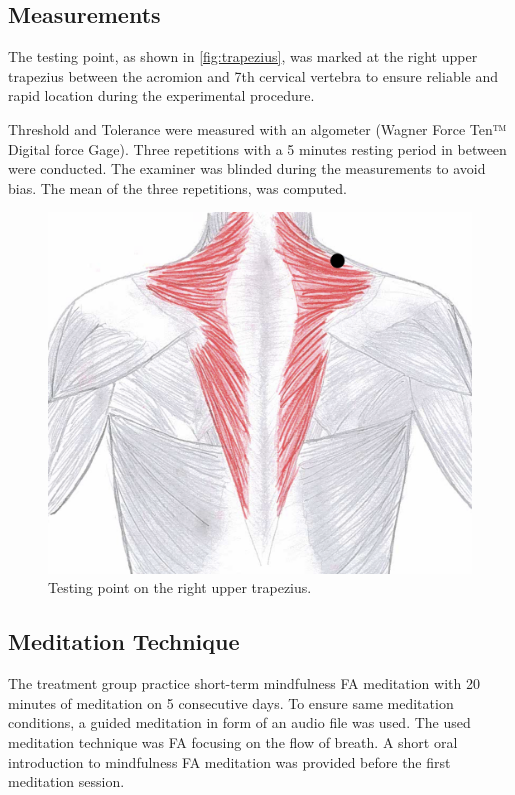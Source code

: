 \subsection{Measurements}%
The testing point, as shown in \autoref{fig:trapezius}, was marked at the right upper trapezius between the acromion and 7th cervical vertebra to ensure reliable and rapid location during the experimental procedure. 

Threshold and Tolerance were measured with an algometer (Wagner Force Ten™ Digital force Gage). Three repetitions with a 5 minutes resting period in between were conducted. The examiner was blinded during the measurements to avoid bias. The mean of the three repetitions, was computed. 

\begin{figure}[H]
\centering
\includegraphics[width=.7\columnwidth]{../figures/trapezius}
\caption{Testing point on the right upper trapezius.}
\label{fig:trapezius}
\end{figure} \vspace{-.5cm}


\subsection{Meditation Technique}
The treatment group practice short-term mindfulness FA meditation with 20 minutes of meditation on 5 consecutive days. To ensure same meditation conditions, a guided meditation in form of an audio file was used. The used meditation technique was FA focusing on the flow of breath. A short oral introduction to mindfulness FA meditation was provided before the first meditation session. 

